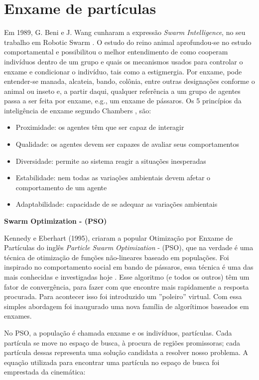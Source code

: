 \documentclass[conference,compsoc]{IEEEtran}
\begin{document}
\section{Enxame de partículas}\label{arte:enxames}

Em 1989, G. Beni e J. Wang cunharam a expressão \textit{Swarm Intelligence}, no seu
trabalho em Robotic Swarm \cite{SRobotics}. O estudo do reino animal aprofundou-se no estudo
comportamental e possibilitou o melhor entendimento de como cooperam indivíduos dentro de um grupo e
quais os mecanismos usados para controlar o enxame e condicionar o indivíduo, tais como a estigmergia. 
Por enxame, pode entender-se manada, alcateia, bando, colônia, entre outras designações conforme o animal 
ou inseto e, a partir daqui, qualquer referência a um grupo de agentes passa a ser feita por enxame, e.g., 
um enxame de pássaros. Os 5 princípios da inteligência de enxame segundo  Chambers \cite{chambers2014computer}, são:
\begin{itemize}
	\item{Proximidade: os agentes têm que ser capaz de interagir}
	\item{Qualidade: os agentes devem ser capazes de avaliar seus comportamentos}
	\item{Diversidade: permite ao sistema reagir a situações inesperadas}
	\item{Estabilidade: nem todas as variações ambientais devem afetar o comportamento de um agente}
	\item{Adaptabilidade: capacidade de se adequar as variações ambientais}
\end{itemize}

\vspace{0.3cm}
\textbf{Swarm Optimization - (PSO)}
\vspace{0.1cm}

Kennedy e Eberhart (1995), criaram a popular Otimização por Enxame de Partículas do inglês \textit{Particle Swarm Optimization} - (PSO), 
que na verdade é uma técnica de otimização de funções não-lineares baseado em populações. Foi inspirado no comportamento
social em bando de pássaros, essa técnica é uma das mais conhecidas e investigadas hoje \cite{Kennedy1995}.
Esse algoritmo (e todos os outros) têm um fator de convergência, para fazer com que encontre mais rapidamente a resposta procurada.
Para acontecer isso foi introduzido um ''poleiro'' virtual. Com essa simples abordagem foi inaugurado uma nova
família de algorítimos baseados em enxames. 

No PSO, a população é chamada enxame e os indivíduos, partículas. Cada partícula se move no espaço de busca, 
à procura de regiões promissoras; cada partícula dessas representa uma solução candidata a resolver nosso problema.
A equação utilizada para encontrar uma partícula no espaço de busca foi emprestada da cinemática:
\end{document}
